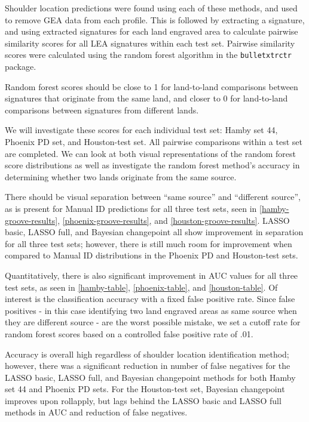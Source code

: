 \documentclass[12pt]{article}
\begin{document}
Shoulder location predictions were found using each of these methods,
and used to remove GEA data from each profile. This is followed by
extracting a signature, and using extracted signatures for each land
engraved area to calculate pairwise similarity scores for all LEA
signatures within each test set. Pairwise similarity scores were
calculated using the random forest algorithm in the
\texttt{bulletxtrctr} package.

Random forest scores should be close to 1 for land-to-land comparisons
between signatures that originate from the same land, and closer to 0
for land-to-land comparisons between signatures from different lands.

We will investigate these scores for each individual test set: Hamby set
44, Phoenix PD set, and Houston-test set. All pairwise comparisons
within a test set are completed. We can look at both visual
representations of the random forest score distributions as well as
investigate the random forest method's accuracy in determining whether
two lands originate from the same source.

There should be visual separation between ``same source'' and
``different source'', as is present for Manual ID predictions for all
three test sets, seen in \autoref{hamby-groove-results},
\autoref{phoenix-groove-results}, and \autoref{houston-groove-results}.
LASSO basic, LASSO full, and Bayesian changepoint all show improvement
in separation for all three test sets; however, there is still much room
for improvement when compared to Manual ID distributions in the Phoenix
PD and Houston-test sets.

Quantitatively, there is also significant improvement in AUC values for
all three test sets, as seen in \autoref{hamby-table},
\autoref{phoenix-table}, and \autoref{houston-table}. Of interest is the
classification accuracy with a fixed false positive rate. Since false
positives - in this case identifying two land engraved areas as same
source when they are different source - are the worst possible mistake,
we set a cutoff rate for random forest scores based on a controlled
false positive rate of .01.

Accuracy is overall high regardless of shoulder location identification
method; however, there was a significant reduction in number of false
negatives for the LASSO basic, LASSO full, and Bayesian changepoint
methods for both Hamby set 44 and Phoenix PD sets. For the Houston-test
set, Bayesian changepoint improves upon rollapply, but lags behind the
LASSO basic and LASSO full methods in AUC and reduction of false
negatives.
\end{document}
